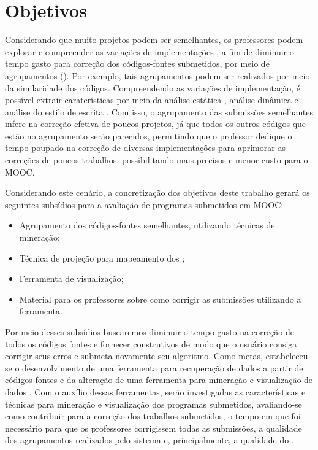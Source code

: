 \chapter{Objetivos}

	Considerando que muito projetos podem ser semelhantes, os professores podem explorar
	e compreender as variações de implementações \cite{Yin:2015}, a fim de diminuir
	o tempo gasto para correção dos códigos-fontes submetidos, por meio de agrupamentos
	(). Por exemplo, tais agrupamentos podem ser realizados por meio
	da similaridade dos códigos. Compreendendo as variações de implementação, é possível
	extrair caraterísticas por meio da análise estática \cite{Yin:2015,Glassman:2014,Taherkhani:2012},
	análise dinâmica \cite{Glassman:2015} e análise do estilo de escrita \cite{Wei2015}.
	Com	isso, o agrupamento das submissões semelhantes infere na correção efetiva de
	poucos projetos, já que todos os outros códigos que estão no agrupamento serão
	parecidos, permitindo que o professor dedique o tempo poupado na correção de diversas
	implementações para aprimorar as correções de poucos trabalhos, possibilitando
	 mais precisos e menor custo para o \acs{MOOC}.
	
	Considerando este cenário, a concretização dos objetivos deste trabalho gerará
	os seguintes subsídios para a avaliação de programas submetidos em \acs{MOOC}:  %
	\begin{itemize}
		\item Agrupamento dos códigos-fontes semelhantes, utilizando técnicas de mineração;
		\item Técnica de projeção para mapeamento dos ;
		\item Ferramenta de visualização;
		\item Material para os professores sobre como corrigir as submissões utilizando a ferramenta.
	\end{itemize}
	
	Por meio desses subsídios buscaremos diminuir o tempo gasto na correção de todos os códigos
	fontes e  fornecer  construtivos de modo que o usuário consiga
	corrigir seus erros e submeta novamente seu algoritmo. Como metas, estabeleceu-se
	o desenvolvimento de uma ferramenta para recuperação de dados a partir de
	códigos-fontes e da alteração de uma ferramenta para mineração e visualização de
	dados \cite{Alencar-etal:2012}. Com o auxílio dessas ferramentas, serão investigadas as
	características e técnicas para mineração e visualização dos programas submetidos,
	avaliando-se como contribuir para a correção dos trabalhos submetidos, o tempo em
	que foi necessário para que os professores corrigissem todas as submissões, a
	qualidade dos agrupamentos realizados pelo sistema e, principalmente, a
	qualidade do .
